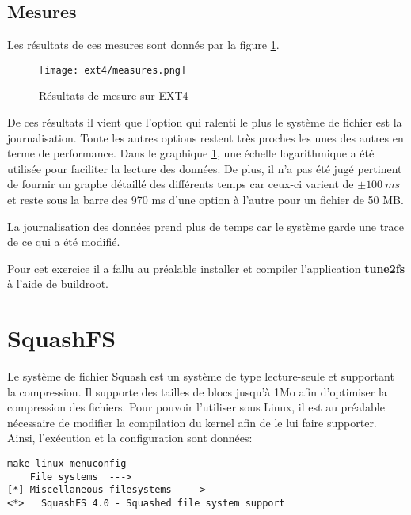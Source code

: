 \subsection{Mesures}
Les résultats de ces mesures sont donnés par la figure \ref{fig:measure ext4}.
\begin{figure}[H]
	\centering
	\texttt{[image: ext4/measures.png]}
	\caption{\label{fig:measure ext4}Résultats de mesure sur EXT4}
\end{figure}

De ces résultats il vient que l'option qui ralenti le plus le système de fichier est la journalisation. Toute les autres options restent très proches les unes des autres en terme de performance. Dans le graphique \ref{fig:measure ext4}, une échelle logarithmique a été utilisée pour faciliter la lecture des données. De plus, il n'a pas été jugé pertinent de fournir un graphe détaillé des différents temps car ceux-ci varient de $\pm 100\ ms$ et reste sous la barre des 970 ms d'une option à l'autre pour un fichier de 50 MB.

La journalisation des données prend plus de temps car le système garde une trace de ce qui a été modifié.

Pour cet exercice il a fallu au préalable installer et compiler l'application \textbf{tune2fs} à l'aide de buildroot.

\section{SquashFS}
Le système de fichier Squash est un système de type lecture-seule et supportant la compression. Il supporte des tailles de blocs jusqu'à 1Mo afin d'optimiser la compression des fichiers. Pour pouvoir l'utiliser sous Linux, il est au préalable nécessaire de modifier la compilation du kernel afin de le lui faire supporter. Ainsi, l'exécution et la configuration sont données:

\begin{lstlisting}
make linux-menuconfig
    File systems  --->
[*] Miscellaneous filesystems  --->
<*>   SquashFS 4.0 - Squashed file system support
\end{lstlisting}

